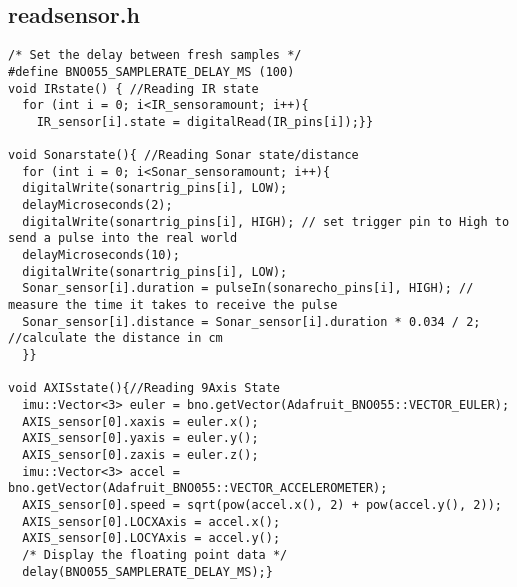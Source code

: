 \subsection{readsensor.h}
\begin{lstlisting}
/* Set the delay between fresh samples */
#define BNO055_SAMPLERATE_DELAY_MS (100)
void IRstate() { //Reading IR state
  for (int i = 0; i<IR_sensoramount; i++){
    IR_sensor[i].state = digitalRead(IR_pins[i]);}}

void Sonarstate(){ //Reading Sonar state/distance
  for (int i = 0; i<Sonar_sensoramount; i++){
  digitalWrite(sonartrig_pins[i], LOW); 
  delayMicroseconds(2);
  digitalWrite(sonartrig_pins[i], HIGH); // set trigger pin to High to send a pulse into the real world
  delayMicroseconds(10);
  digitalWrite(sonartrig_pins[i], LOW); 
  Sonar_sensor[i].duration = pulseIn(sonarecho_pins[i], HIGH); // measure the time it takes to receive the pulse
  Sonar_sensor[i].distance = Sonar_sensor[i].duration * 0.034 / 2; //calculate the distance in cm
  }}

void AXISstate(){//Reading 9Axis State
  imu::Vector<3> euler = bno.getVector(Adafruit_BNO055::VECTOR_EULER);
  AXIS_sensor[0].xaxis = euler.x();
  AXIS_sensor[0].yaxis = euler.y();
  AXIS_sensor[0].zaxis = euler.z();
  imu::Vector<3> accel = bno.getVector(Adafruit_BNO055::VECTOR_ACCELEROMETER);
  AXIS_sensor[0].speed = sqrt(pow(accel.x(), 2) + pow(accel.y(), 2));
  AXIS_sensor[0].LOCXAxis = accel.x();
  AXIS_sensor[0].LOCYAxis = accel.y();
  /* Display the floating point data */
  delay(BNO055_SAMPLERATE_DELAY_MS);}



\end{lstlisting}
